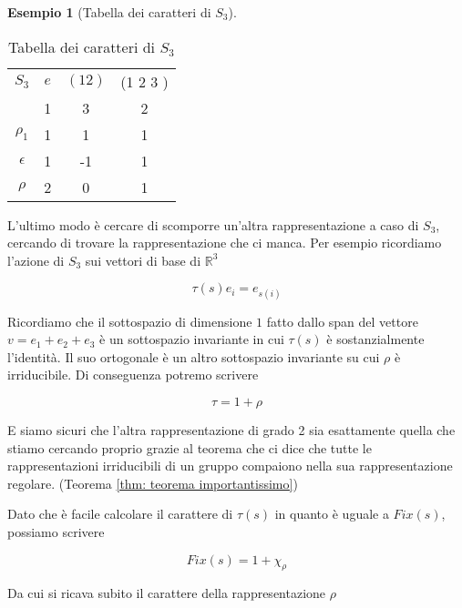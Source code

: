\documentclass[11pt]{article}
\theoremstyle{plain}
\theoremstyle{definition}
\newtheorem{exmp}{Esempio}[section]
\theoremstyle{remark}
\begin{document}
\begin{exmp}[Tabella dei caratteri di $S_3$]
\begin{table}[!ht]
\centering
\begin{tabular}{|c|c|c|c|}
\hline
$S_3$  & $e$ & $(1 2)$ & (1 2 3 )    \\
 & 1 & 3 & 2 \\
\hline
 $\rho_1$ & 1 & 1  & 1 \\
\hline
$\epsilon$ & 1 & -1 & 1 \\
\hline
$\rho$ & 2 & 0 & 1 \\
\hline
\end{tabular}
\caption{Tabella dei caratteri di $S_3$}
\label{tabella caratteri s3}
\end{table}

L'ultimo modo è cercare di scomporre un'altra rappresentazione a caso di $S_3$, cercando di trovare la rappresentazione che ci manca. Per esempio ricordiamo l'azione di $S_3$ sui vettori di base di $\mathbb{R}^3$

\[ \tau(s) e_i = e_{s(i)}\]

Ricordiamo che il sottospazio di dimensione $1$ fatto dallo span del vettore $v = e_1 + e_2 + e_3$ è un sottospazio invariante in cui $\tau(s)$ è sostanzialmente l'identità. Il suo ortogonale è un altro sottospazio invariante su cui $\rho$ è irriducibile. Di conseguenza potremo scrivere

\[ \tau = 1 + \rho\]

E siamo sicuri che l'altra rappresentazione di grado 2 sia esattamente quella che stiamo cercando proprio grazie al teorema che ci dice che tutte le rappresentazioni irriducibili di un gruppo compaiono nella sua rappresentazione regolare. (Teorema \ref{thm: teorema importantissimo})

Dato che è facile calcolare il carattere di $\tau(s)$ in quanto è uguale a $Fix(s)$, possiamo scrivere

\[ Fix(s) = 1 + \chi_\rho\]

Da cui si ricava subito il carattere della rappresentazione $\rho$



\end{exmp}
\end{document}
